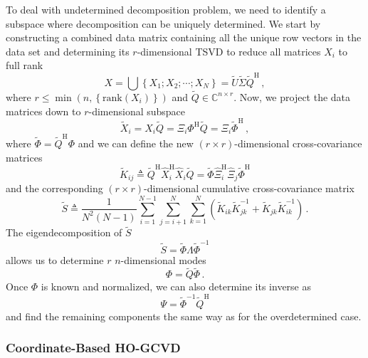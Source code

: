 \documentclass[10pt]{article}
\begin{document}
To deal with undetermined decomposition problem, we need to identify a subspace where decomposition can be uniquely determined.
We start by constructing a combined data matrix containing all the unique row vectors in the data set and determining its $r$-dimensional TSVD to reduce all matrices $X_i$ to full rank
\begin{equation}
    X = \bigcup \left\{X_1; X_2; \cdots; X_N\right\}
    = \tilde U \tilde \Sigma \tilde Q^\mathrm{H}\,,
\end{equation}
where $r \le \min\left(n, \left\{\mathrm{rank}(X_i)\right\}\right)$ and $\tilde Q\in\mathbb{C}^{n\times r}$.
Now, we project the data matrices down to $r$-dimensional subspace
\begin{equation}
    \tilde X_i = X_i \tilde Q = \Xi_i \Phi^\mathrm{H}  \tilde Q =\Xi_i \tilde \Phi^\mathrm{H}\,,
\end{equation}
where $\tilde \Phi= \tilde Q^\mathrm{H} \Phi$ and we can define the new $(r\times r)$-dimensional cross-covariance matrices
\begin{equation}
    \tilde K_{ij} \triangleq \tilde Q^\mathrm{H} \hat X_i^\mathrm{H} \hat X_i \tilde Q = \tilde \Phi \hat \Xi_i^\mathrm{H}\hat \Xi_j  \tilde \Phi^\mathrm{H}
\end{equation}
and the corresponding $(r\times r)$-dimensional cumulative cross-covariance matrix
\begin{equation}
    \tilde S \triangleq \frac{1}{N^2(N-1)}\sum_{i=1}^{N-1} \sum_{j=i+1}^N \sum_{k=1}^N \left(\tilde K_{ik} \tilde K_{jk}^{-1} + \tilde K_{jk} \tilde K_{ik}^{-1}\right)\,.
\end{equation}
The eigendecomposition of $\tilde S$
\begin{equation}
    \tilde S = \tilde \Phi \Lambda \tilde \Phi^{-1}
\end{equation}
allows us to determine $r$ $n$-dimensional modes
\begin{equation}
    \Phi = \tilde Q \tilde \Phi\,.
\end{equation}
Once $\Phi$ is known and normalized, we can also determine its inverse as
\begin{equation}
    \Psi = \tilde \Phi^{-1}\tilde Q^\mathrm{H}
\end{equation}
and find the remaining components the same way as for the overdetermined case.


\subsubsection{Coordinate-Based HO-GCVD}
\end{document}
